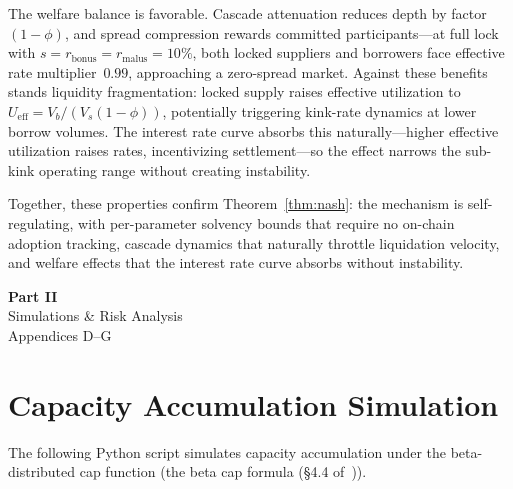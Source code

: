 \documentclass[10pt,a4paper,twocolumn]{article}
\theoremstyle{definition}
\theoremstyle{plain}
\theoremstyle{remark}
\begin{document}
The welfare balance is favorable. Cascade attenuation reduces depth by factor~$(1{-}\phi)$, and spread compression rewards committed participants---at full lock with $s = r_{\text{bonus}} = r_{\text{malus}} = 10\%$, both locked suppliers and borrowers face effective rate multiplier~$0.99$, approaching a zero-spread market. Against these benefits stands liquidity fragmentation: locked supply raises effective utilization to $U_{\text{eff}} = V_b / (V_s(1{-}\phi))$, potentially triggering kink-rate dynamics at lower borrow volumes. The interest rate curve absorbs this naturally---higher effective utilization raises rates, incentivizing settlement---so the effect narrows the sub-kink operating range without creating instability.

Together, these properties confirm Theorem~\ref{thm:nash}: the mechanism is self-regulating, with per-parameter solvency bounds that require no on-chain adoption tracking, cascade dynamics that naturally throttle liquidation velocity, and welfare effects that the interest rate curve absorbs without instability.

\clearpage
\onecolumn
\thispagestyle{empty}
\vspace*{\fill}
\begin{center}
  {\fontsize{36}{42}\selectfont\bfseries Part II}\\[1.5em]
  {\LARGE Simulations \& Risk Analysis}\\[1em]
  {\large\color{codegray} Appendices D--G}
\end{center}
\vspace*{\fill}
\clearpage
\twocolumn

\section{Capacity Accumulation Simulation}
\label{apx:simulation}

The following Python script simulates capacity accumulation under the beta-distributed cap function (the beta cap formula (\S4.4 of~\cite{wp})).
\end{document}
